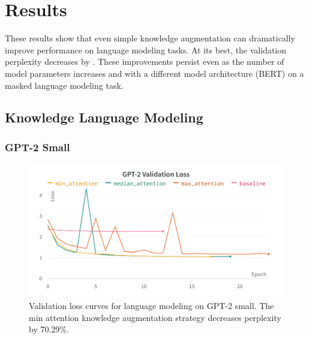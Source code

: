 \documentclass[phd,electronic,oneside,twosidetoc,letterpaper,chaptercenter,parttop,lof]{byumsphd}
\begin{document}
\section{Results}

These results show that even simple knowledge augmentation can dramatically improve performance on language modeling tasks.
At its best, the validation perplexity decreases by \LMLossPercentageDecrease.
These improvements persist even as the number of model parameters increases and with a different model architecture (BERT) on a masked language modeling task.


\subsection{Knowledge Language Modeling}

\subsubsection{GPT-2 Small}

\begin{figure}
    \includegraphics[width=\columnwidth]{images/ssm/gpt2-small-val-loss-curves.png}
    \centering
    \caption[GPT-2 small validation loss curves]{
        Validation loss curves for language modeling on GPT-2 small.
        The min attention knowledge augmentation strategy decreases perplexity by 70.29\%.
    }
    \label{fig:gpt2-small-val-loss-curves}
\end{figure}
\end{document}
